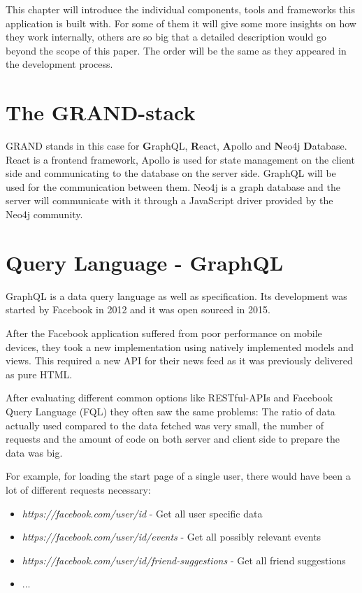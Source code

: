 This chapter will introduce the individual components, tools and frameworks this application is built with. For some of them it will give some more insights on how they work internally, others are so big that a detailed description would go beyond the scope of this paper. The order will be the same as they appeared in the development process.

\section{The GRAND-stack}
GRAND stands in this case for \textbf{G}raphQL, \textbf{R}eact, \textbf{A}pollo and \textbf{N}eo4j \textbf{D}atabase. \cite{GrandStackGettingStarted} React is a frontend framework, Apollo is used for state management on the client side and communicating to the database on the server side. GraphQL will be used for the communication between them. Neo4j is a graph database and the server will communicate with it through a JavaScript driver provided by the Neo4j community.

\section{Query Language - GraphQL}
GraphQL is a data query language as well as specification. Its development was started by Facebook in 2012 and it was open sourced in 2015. \cite{GraphQLFoundation}

After the Facebook application suffered from poor performance on mobile devices, they took a new implementation using natively implemented models and views. This required a new API for their news feed as it was previously delivered as pure HTML. \cite{EngineeringFB}

After evaluating different common options like RESTful-APIs and Facebook Query Language (FQL) they often saw the same problems:  The ratio of data actually used compared to the data fetched was very small, the number of requests \cite{GraphQLIntro} and the amount of code on both server and client side to prepare the data was big. \cite{EngineeringFB}

For example, for loading the start page of a single user, there would have been a lot of different requests necessary:
\begin{itemize}
\item \emph{https://facebook.com/user/id} - Get all user specific data
\item \emph{https://facebook.com/user/id/events} - Get all possibly relevant events
\item \emph{https://facebook.com/user/id/friend-suggestions} - Get all friend suggestions
\item ...
\end{itemize} \cite{GraphQLIntro}

